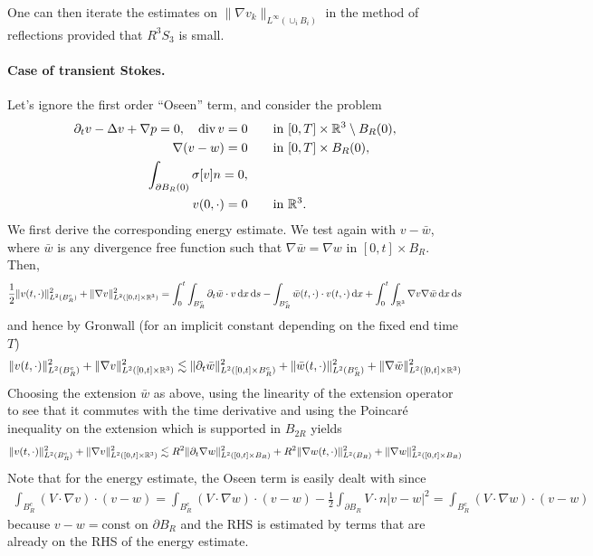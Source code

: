 \documentclass[abstracton, paper=a4, fontsize=11pt,DIV=12,bibliography=totoc]{scrartcl}
\begin{document}
One can then iterate the estimates on $\|\nabla v_k\|_{L^\infty(\cup_i B_i)}$ in the method of reflections provided that $R^3 S_3$ is small. 

\paragraph{Case of transient Stokes.}
Let's ignore the first order \enquote{Oseen} term, and consider the problem 
\begin{align}
  \partial_t v  -  \Delta v + \nabla p = 0, \quad \operatorname{div}  v = 0 & \qquad  \text{in } [0,
    T] \times  \mathbb{R}^3 \setminus B_R(0), \\
    \nabla (v - w) = 0   & \qquad  \text{in } [0,
    T] \times  B_R(0), \\
    \int_{\partial B_R(0)} \sigma[ v] n = 0, \\
            v(0,\cdot) = 0 & \qquad  \text{in }  \mathbb{R}^3.
\end{align}
We first derive the corresponding energy estimate. We test again with $v-\bar w$, where $\bar w$ is any divergence free function such that $\nabla \bar w = \nabla w $ in $[0,t] \times  B_R$.
Then, 
\begin{align*}
    \frac 1 2 \|v(t,\cdot)\|_{L^2( B_R^c)}^2  + \|\nabla  v\|_{L^2([0,t] \times \mathbb{R}^3)}^2 = \int_0^t \int_{B_R^c} \partial_t \bar w \cdot v \, \mathrm{d} x \, \mathrm{d} s- \int_{B_R^c} \bar w(t,\cdot)  \cdot v(t,\cdot) \, \mathrm{d} x +  \int_0^t \int_{\mathbb{R}^3} \nabla v \nabla \bar w \, \mathrm{d} x \, \mathrm{d} s
\end{align*}
and hence by Gronwall (for an implicit constant depending on the fixed end time $T$)
\begin{align}
    \|v(t,\cdot)\|_{L^2(B_R^c)}^2  + \|\nabla  v\|_{L^2([0,t] \times \mathbb{R}^3)}^2 \lesssim \|\partial_t \bar w\|_{L^2([0,t]\times B_R^c)}^2 + \|\bar w(t,\cdot)\|_{L^2(B_R^c)}^2  + \|\nabla  \bar w\|_{L^2([0,t] \times \mathbb{R}^3)}^2
\end{align}
Choosing the extension $\bar w $ as above, using the linearity of the extension operator to see that it commutes with the time derivative and using the Poincar\'e inequality on the extension which is supported in $B_{2R}$ yields
\begin{align} \label{v.est}
        \|v(t,\cdot)\|_{L^2(B_R^c)}^2  + \|\nabla  v\|_{L^2([0,t] \times \mathbb{R}^3)}^2 \lesssim R^2 \|\partial_t \nabla  w\|_{L^2([0,t]\times B_R)}^2 + R^2 \|\nabla w(t,\cdot)\|_{L^2(B_R)}^2  + \|\nabla  w\|_{L^2([0,t] \times  B_R)}^2
\end{align}
Note that for the energy estimate, the Oseen term is easily dealt with since
\begin{align*}
    \int_{B_R^c} (V \cdot \nabla v) \cdot(v-w) =  \int_{B_R^c}  (V \cdot \nabla w) \cdot(v-w) -  \frac 1 2 \int_{\partial B_R} V \cdot n |v-w|^2 = \int_{B_R^c}  (V \cdot \nabla w) \cdot(v-w)
\end{align*}
because $v - w = \mathrm{const}$ on $\partial B_R$ and the RHS is estimated by terms that are already on the RHS of the energy estimate.
\end{document}
